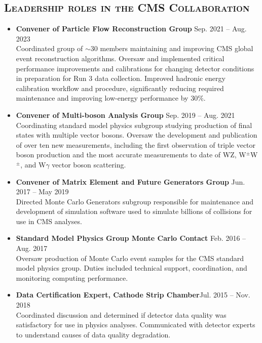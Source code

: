 \documentclass[10pt]{res} %
\begin{document}
\begin{resume}
\section{\textsc{Leadership roles in the CMS Collaboration}}
\begin{itemize}
\item{\textbf{Convener of Particle Flow Reconstruction Group} \hfill{Sep. 2021 -- Aug. 2023}} \\
    Coordinated group of $\sim$30 members maintaining and improving CMS global event reconstruction algorithms.
    Oversaw and implemented critical performance improvements and calibrations for 
    changing detector conditions in preparation for Run 3 data collection.
    Improved hadronic energy calibration workflow and procedure, significantly
    reducing required maintenance and improving low-energy performance by 30\%.
\item{\textbf{Convener of Multi-boson Analysis Group} \hfill{Sep. 2019 -- Aug. 2021}} \\
    Coordinating standard model physics subgroup studying production of final states
    with multiple vector bosons. Oversaw the development and publication of over ten new measurements, 
    including the first observation of triple vector boson production and the most accurate measurements 
    to date of WZ, W$^{\pm}$W$^{\pm}$, and W$\gamma$ vector boson scattering. 
\item{\textbf{Convener of Matrix Element and Future Generators Group} \hfill{Jun. 2017 -- May 2019}}\\
    Directed Monte Carlo Generators subgroup 
    responsible for maintenance and development of simulation software used to simulate
    billions of collisions for use in CMS analyses.
\item{\textbf{Standard Model Physics Group Monte Carlo Contact} \hfill{Feb. 2016 -- Aug. 2017}} \\
    Oversaw production of Monte Carlo event samples for the CMS standard model physics group. 
    Duties included technical support, coordination, and monitoring computing performance.
\item{\textbf{ Data Certification Expert, Cathode Strip Chamber}\hfill{Jul. 2015 -- Nov. 2018}} \\
    Coordinated discussion and determined if
    detector data quality was satisfactory for use in physics analyses.
    Communicated with detector experts to understand
    causes of data quality degradation.
\end{itemize}


\end{resume}
\end{document}
